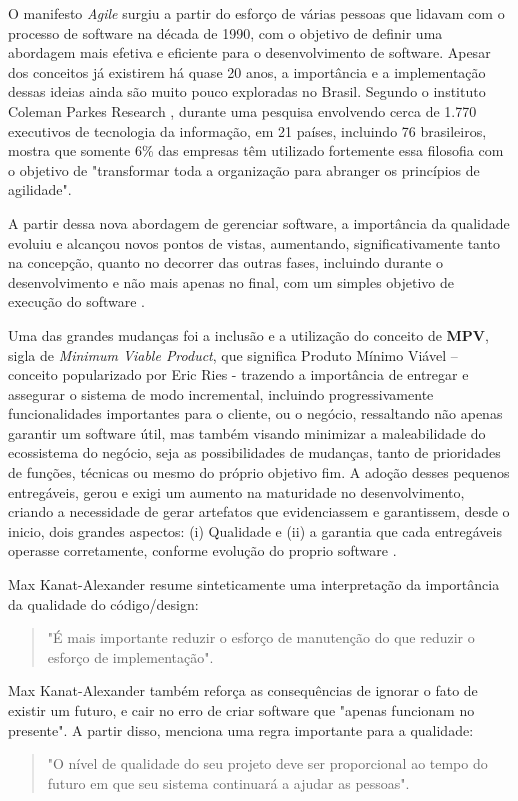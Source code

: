 \documentclass[12pt]{article}
\begin{document}
 O manifesto \textit{Agile} \cite{MANISFESTOAGILE} surgiu a partir do esforço de várias pessoas que lidavam com o processo de software na década de 1990, com o objetivo de definir uma abordagem mais efetiva e eficiente para o desenvolvimento de software. Apesar dos conceitos já existirem há quase 20 anos, a importância e a implementação dessas ideias ainda são muito pouco exploradas no Brasil. Segundo o instituto Coleman Parkes Research \cite{COLEMANPARKES_AGILE_2017}, durante uma pesquisa envolvendo cerca de 1.770 executivos de tecnologia da informação, em 21 países, incluindo 76 brasileiros, mostra que somente 6\% das empresas têm utilizado fortemente essa filosofia com o objetivo de "transformar toda a organização para abranger os princípios de agilidade".

 A partir dessa nova abordagem de gerenciar software, a importância da qualidade evoluiu e alcançou novos pontos de vistas, aumentando, significativamente tanto na concepção, quanto no decorrer das outras fases, incluindo durante o desenvolvimento e não mais apenas no final, com um simples objetivo de execução do software \cite{WATERFALL_MODEL}.

 Uma das grandes mudanças foi a inclusão e a utilização do conceito de \textbf{MPV}, sigla de \textit{Minimum Viable Product}, que significa Produto Mínimo Viável – conceito popularizado por Eric Ries \cite{ERICRIES_THELEAN} - trazendo a importância de entregar e assegurar o sistema de modo incremental, incluindo progressivamente funcionalidades importantes para o cliente, ou o negócio, ressaltando não apenas garantir um software útil, mas também visando minimizar a maleabilidade do ecossistema do negócio, seja as possibilidades de mudanças, tanto de prioridades de funções, técnicas ou mesmo do próprio objetivo fim. A adoção desses pequenos entregáveis, gerou e exigi um aumento na maturidade no desenvolvimento, criando a necessidade de gerar artefatos que evidenciassem e garantissem, desde o inicio, dois grandes aspectos: (i) Qualidade e (ii) a garantia que cada entregáveis operasse corretamente, conforme evolução do proprio software \cite{AGILE_WORKING_PROCESS}.

Max Kanat-Alexander \cite{CODE_SIMPLICITY} resume sinteticamente uma interpretação da importância da qualidade do código/design:
\begin{quote}
 "É mais importante reduzir o esforço de manutenção do que reduzir o esforço de implementação".
\end{quote}

Max Kanat-Alexander \cite{CODE_SIMPLICITY} também reforça as consequências de ignorar o fato de existir um futuro, e cair no erro de criar software que "apenas funcionam no presente". A partir disso, menciona uma regra importante para a qualidade:
\begin{quote}
 "O nível de qualidade do seu projeto deve ser proporcional ao tempo do futuro em que seu sistema continuará a ajudar as pessoas".
\end{quote}
\end{document}
